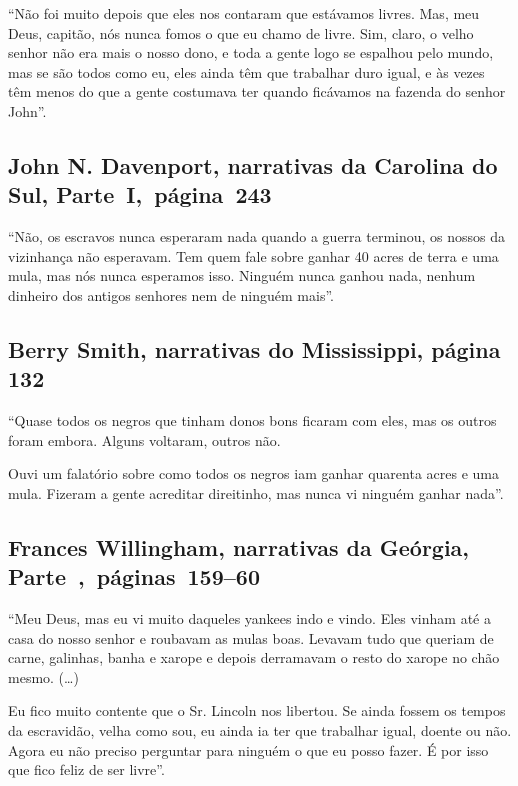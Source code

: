 ``Não foi muito depois que eles nos contaram que estávamos livres. Mas,
meu Deus, capitão, nós nunca fomos o que eu chamo de livre. Sim, claro,
o velho senhor não era mais o nosso dono, e toda a gente logo se
espalhou pelo mundo, mas se são todos como eu, eles ainda têm que
trabalhar duro igual, e às vezes têm menos do que a gente costumava ter
quando ficávamos na fazenda do senhor John''.

\subsection{John N. Davenport, narrativas da Carolina do Sul, Parte~I,~página~243} \label{ref67}

``Não, os escravos nunca esperaram nada quando a guerra terminou, os
nossos da vizinhança não esperavam. Tem quem fale sobre ganhar 40 acres
de terra e uma mula, mas nós nunca esperamos isso. Ninguém nunca ganhou
nada, nenhum dinheiro dos antigos senhores nem de ninguém mais''.

\subsection{Berry Smith, narrativas do Mississippi, página 132}
\label{ref242}

``Quase todos os negros que tinham donos bons ficaram com eles, mas os
outros foram embora. Alguns voltaram, outros não.

Ouvi um falatório sobre como todos os negros iam ganhar quarenta acres e
uma mula. Fizeram a gente acreditar direitinho, mas nunca vi ninguém
ganhar nada''.

\subsection{Frances Willingham, narrativas da Geórgia, Parte~,~páginas~159--60}
\label{ref297}

``Meu Deus, mas eu vi muito daqueles yankees indo e vindo. Eles vinham
até a casa do nosso senhor e roubavam as mulas boas. Levavam tudo que
queriam de carne, galinhas, banha e xarope e depois derramavam o resto
do xarope no chão mesmo. (\ldots{})

Eu fico muito contente que o Sr. Lincoln nos libertou. Se ainda fossem
os tempos da escravidão, velha como sou, eu ainda ia ter que trabalhar
igual, doente ou não. Agora eu não preciso perguntar para ninguém o que
eu posso fazer. É por isso que fico feliz de ser livre''.

